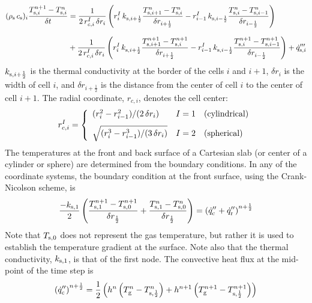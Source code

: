 \begin{align}
\label{crank-nicolson}
(\rho_{\rm s} \, c_{\rm s})_i \frac{T_{{\rm s},i}^{n+1}-T_{{\rm s},i}^{n}}{\delta t}
& = \frac{1}{2 \, r_{c,i}^I \, \delta r_i} \left( r_{i}^{I} \, k_{{\rm s},i+\frac{1}{2}} \frac{T_{{\rm s},i+1}^{n}-T_{{\rm s},i}^{n}}{\delta r_{i+\frac{1}{2}}} - r_{i-1}^{I} \, k_{{\rm s},i-\frac{1}{2}} \frac{T_{{\rm s},i}^{n}-T_{{\rm s},i-1}^{n}}{\delta r_{i-\frac{1}{2}}} \right) \notag \\[0.1in]
& +\frac{1}{2 \, r_{c,i}^I \, \delta r_i} \left( r_{i}^{I} \, k_{{\rm s},i+\frac{1}{2}} \frac{T_{{\rm s},i+1}^{n+1}-T_{{\rm s},i}^{n+1}}{\delta r_{i+\frac{1}{2}}} - r_{i-1}^{I} \, k_{{\rm s},i-\frac{1}{2}} \frac{T_{{\rm s},i}^{n+1}-T_{{\rm s},i-1}^{n+1}}{\delta r_{i-\frac{1}{2}}} \right) + \dot{q}'''_{{\rm s},i}
\end{align}
$k_{{\rm s},i+\frac{1}{2}}$ is the thermal conductivity at the border of the cells $i$ and $i+1$, $\delta r_i$ is the width of cell $i$, and  $\delta r_{i+\frac{1}{2}}$ is the distance from the center of cell $i$ to the center of cell $i+1$. The radial coordinate, $r_{c,i}$, denotes the cell center:
\begin{equation}
r_{c,i}^I = \left\{
\begin{array}{ll} (r_i^2 - r_{i-1}^2)/(2 \, \delta r_i)            & I=1 \quad \hbox{(cylindrical)} \\ [0.1in]
                   \sqrt{ ( r_i^3 - r_{i-1}^3)/(3 \, \delta r_i) } & I=2 \quad \hbox{(spherical)}
\end{array} \right.
\end{equation}
The temperatures at the front and back surface of a Cartesian slab (or center of a cylinder or sphere) are determined from the boundary conditions. In any of the coordinate systems, the boundary condition at the front surface, using the Crank-Nicolson scheme, is
\begin{equation}
\label{bc_front}
 \frac{-k_{\rm s,1}}{2} \left( \frac{T_{\rm s,1}^{n+1}-T_{\rm s,0}^{n+1}}{\delta r_{\frac{1}{2}}} + \frac{T_{\rm s,1}^{n}-T_{\rm s,0}^{n}}{\delta r_{\frac{1}{2}}} \right)
  =  \left( \dot{q}_{\rm c}''+\dot{q}_{\rm r}'' \right)^{n+\frac{1}{2}}
\end{equation}
Note that $T_{\rm s,0}$ does not represent the gas temperature, but rather it is used to establish the temperature gradient at the surface. Note also that the thermal conductivity, $k_{\rm s,1}$, is that of the first node. The convective heat flux at the mid-point of the time step is
\begin{equation}
\label{conv}
  \left( \dot{q}_{\rm c}'' \right)^{n+\frac{1}{2}} = \frac{1}{2} \left( h^n \left(T_{\rm g}^n - T_{\rm s,\frac{1}{2}}^n\right) + h^{n+1} \left(T_{\rm g}^{n+1} - T_{\rm s,\frac{1}{2}}^{n+1} \right) \right)
\end{equation}
